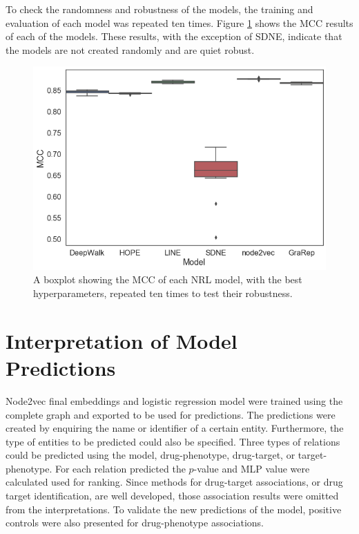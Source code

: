 To check the randomness and robustness of the models, the training and evaluation of each model was repeated ten times. Figure \ref{fig:boxplot} shows the \ac{MCC} results of each of the models. These results, with the exception of SDNE, indicate that the models are not created randomly and are quiet robust.

\begin{figure}[h!]
    \centering
    \includegraphics[scale=0.4]
    {figures/boxplot.png}
    \caption[Boxplot of the robustness of NRL models]{\label{fig:boxplot} A boxplot showing the MCC of each NRL model, with the best hyperparameters, repeated ten times to test their robustness.}
\end{figure}

\section{Interpretation of Model Predictions}

Node2vec final embeddings and logistic regression model were trained using the complete graph and exported to be used for predictions. The predictions were created by enquiring the name or identifier of a certain entity. Furthermore, the type of entities to be predicted could also be specified. Three types of relations could be predicted using the model, drug-phenotype, drug-target, or target-phenotype. For each relation predicted the $p$-value and \ac{MLP} value were calculated used for ranking. Since methods for drug-target associations, or drug target identification, are well developed, those association results were omitted from the interpretations. To validate the new predictions of the model, positive controls were also presented for drug-phenotype associations.

